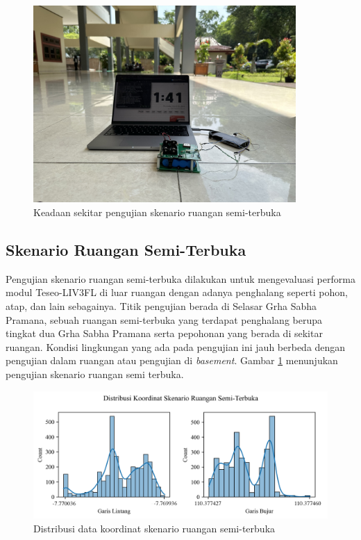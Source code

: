 \begin{figure}[H]
	\centering
	\includegraphics[width=10cm]{contents/chapter-4/3-skenario-semioutdoor/keadaan.jpeg}
	\caption{Keadaan sekitar pengujian skenario ruangan semi-terbuka}
	\label{Fig: semioutdoor-keadaan}
\end{figure}

\subsection{Skenario Ruangan Semi-Terbuka}
Pengujian skenario ruangan semi-terbuka dilakukan untuk mengevaluasi performa modul Teseo\hyp{}LIV3FL di luar ruangan dengan adanya penghalang seperti pohon, atap, dan lain sebagainya. Titik pengujian berada di Selasar Grha Sabha Pramana, sebuah ruangan semi-terbuka yang terdapat penghalang berupa tingkat dua Grha Sabha Pramana serta pepohonan yang berada di sekitar ruangan. Kondisi lingkungan yang ada pada pengujian ini jauh berbeda dengan pengujian dalam ruangan atau pengujian di \textit{basement}. Gambar \ref{Fig: semioutdoor-keadaan} menunjukan pengujian skenario ruangan semi terbuka.

\begin{figure}[H]
	\centering
	\begin{adjustbox}{width=\textwidth}
		\includegraphics{contents/chapter-4/3-skenario-semioutdoor/distribution.png}
	\end{adjustbox}
	\caption{Distribusi data koordinat skenario ruangan semi-terbuka}
	\label{Fig:semioutdoor-distribution}
\end{figure}

